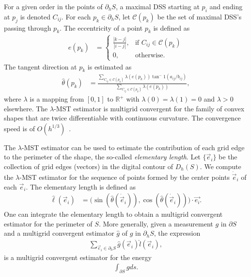For a given order in the points of $\partial_h S$, a maximal DSS starting at $p_i$ and ending at $p_j$ is denoted $C_{ij}$. For each $p_k \in \partial_h S$, let $\mathcal{C}(p_k)$ be the set of maximal DSS's passing through $p_k$. The eccentricity of a point $p_k$ is defined as
\begin{align*}
	e(p_k) &= \left\{ \begin{array}{cc}
	\frac{|k-j|}{|i-j|}, & \text{if } C_{ij} \in \mathcal{C}(p_k) \\
	0, & \text{otherwise}.
	\end{array}\right.
\end{align*}
%
The tangent direction at $p_k$ is estimated as
\begin{align*}
	\hat{\theta}(p_k) &= \frac{ \sum_{C_{ij} \in \mathcal{C}(p_k) }{ \lambda( e(p_k) ) \tan^-1(a_{ij}/b_{ij}) } }{ \sum_{C_{ij} \in \mathcal{C}(p_k) }{ \lambda( e(p_k) )} },
\end{align*}
%
where $\lambda$ is a mapping from $[0,1]$ to $\mathbb{R}^+$ with $\lambda(0)=\lambda(1)=0$ and $\lambda > 0$ elsewhere. The $\lambda$-MST estimator is multigrid convergent for the family of convex shapes that are twice differentiable with continuous curvature. The convergence speed is of $O(h^{1/3})$~\cite{lachaud07tangent}.

The $\lambda$-MST estimator can be used to estimate the contribution of each grid edge to the perimeter of the shape, the so-called \emph{elementary length}. Let $\{\vec{e}_i\}$ be the collection of grid edges (vectors) in the digital contour of $D_h(S)$. We compute the $\lambda$-MST estimator for the sequence of points formed by the center points $\dot{\vec{e}}_i$ of each $\vec{e}_i$. The elementary length is defined as
\begin{align*}
\hat{\ell}(\vec{e}_i) &= \big( \sin( \hat{\theta}(\dot{\vec{e}}_i) ), \cos( \hat{\theta}(\dot{\vec{e}}_i) ) \big) \cdot \vec{e_i}.
\end{align*}
%
One can integrate the elementary length to obtain a multigrid convergent estimator for the perimeter of $S$. More generally, given a measurement $g$ in $\partial S$ and a multigrid convergent estimator $\hat{g}$ of $g$ in $\partial_h S$, the expression
\begin{align*}
	\sum_{\vec{e}_i \in \partial_h S}{ \hat{g}(\vec{e}_i) \hat{l}(\vec{e}_i)},
\end{align*}
%
is a multigrid convergent estimator for the energy~\cite{lachaud06hdr}
\begin{align*}
	\int_{\partial S}{ g ds }.
\end{align*}
%
%
%

